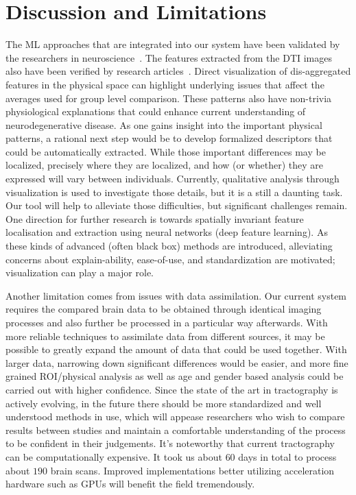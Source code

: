 \section{Discussion and Limitations}


The ML approaches that are integrated into our system have been validated by the researchers in neuroscience~\cite{mateos2018structural,tanveer2020machine}. The features extracted from the DTI images also have been verified by research articles~\cite{acosta2016whole, wen2016white}. Direct visualization of dis-aggregated features in the physical space can highlight underlying issues that affect the averages used for group level comparison. These patterns also have non-trivia physiological explanations that could enhance current understanding of neurodegenerative disease. As one gains insight into the important physical patterns, a rational next step would be to develop formalized descriptors that could be automatically extracted. While those important differences may be localized, precisely where they are localized, and how (or whether) they are expressed will vary between individuals. Currently, qualitative analysis through visualization is used to investigate those details, but it is a still a daunting task. Our tool will help to alleviate those difficulties, but significant challenges remain. One direction for further research is towards spatially invariant feature localisation and extraction using  neural networks (deep feature learning). As these kinds of advanced (often black box) methods are introduced, alleviating concerns about explain-ability, ease-of-use, and standardization are motivated; visualization can play a major role.

Another limitation comes from issues with data assimilation. Our current system requires the compared brain data to be obtained through identical imaging processes and also further be processed in a particular way afterwards. With more reliable techniques to assimilate data from different sources, it may be possible to greatly expand the amount of data that could be used together. With larger data, narrowing down significant differences would be easier, and more fine grained ROI/physical analysis as well as age and gender based analysis could be carried out with higher confidence. Since the state of the art in tractography is actively evolving, in the future there should be more standardized and well understood methods in use, which will appease researchers who wish to compare results between studies and maintain a comfortable understanding of the process to be confident in their judgements. 
It's noteworthy that 
current tractography can be computationally expensive. It took us about $60$ days in total to process about $190$ brain scans. Improved implementations better utilizing acceleration hardware such as GPUs will benefit the field tremendously. 


